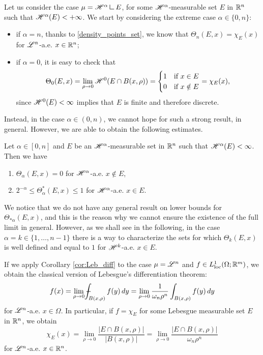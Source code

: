 Let us consider the case $\mu = \Haus{\alpha} \res E$, for some $\mathscr{H}^{\alpha}$-measurable set $E$ in $\mathbb{R}^{n}$ such that $\mathscr{H}^{\alpha}(E) < + \infty$. We start by considering the extreme case $\alpha \in \{0, n\}$:
\begin{itemize}
\item if $\alpha = n$, thanks to \eqref{density_points_set}, we know that $\Theta_{n}(E, x) = \chi_{E}(x)$ for $\mathscr{L}^{n}$-a.e. $x \in \mathbb{R}^{n}$; 
\item if $\alpha = 0$, it is easy to check that
\begin{equation*}
\Theta_{0}(E, x) = \lim_{\rho \to 0} \mathscr{H}^{0}(E \cap B(x, \rho)) = \begin{cases} 1 & \text{if} \ x \in E \\
0 & \text{if} \ x \notin E
\end{cases} = \chi_{E}(x),
\end{equation*} 
since $\mathscr{H}^{0}(E) < \infty$ implies that $E$ is finite and therefore discrete.
\end{itemize}
Instead, in the case $\alpha \in (0, n)$, we cannot hope for such a strong result, in general. However, we are able to obtain the following estimates.

\begin{proposition}
Let $\alpha \in [0, n]$ and $E$ be an $\mathscr{H}^{\alpha}$-measurable set in $\mathbb{R}^{n}$ such that $\mathscr{H}^{\alpha}(E) < \infty$. Then we have
\begin{enumerate}
\item $\Theta_{\alpha}(E, x) = 0$ for $\mathscr{H}^{\alpha}$-a.e. $x \notin E$,
\item $2^{-\alpha} \le \Theta^{*}_{\alpha}(E, x) \le 1$ for $\mathscr{H}^{\alpha}$-a.e. $x \in E$.
\end{enumerate}
\end{proposition}

We notice that we do not have any general result on lower bounds for $\Theta_{* \alpha}(E, x)$, and this is the reason why we cannot ensure the existence of the full limit in general. However, as we shall see in the following, in the case $\alpha = k \in \{1, \dots, n - 1\}$ there is a way to characterize the sets for which $\Theta_{k}(E, x)$ is well defined and equal to $1$ for $\mathscr{H}^{k}$-a.e. $x \in E$.

\begin{remark}
If we apply Corollary \ref{cor:Leb_diff} to the case $\mu = \mathscr{L}^{n}$ and $f \in L^{1}_{\rm loc}(\Omega; \mathbb{R}^{m})$, we obtain the classical version of Lebesgue's differentiation theorem:
\begin{equation*}
f(x) = \lim_{\rho \to 0} -\hspace{-1.13em}\int_{B(x, \rho)} f(y) \, dy = \lim_{\rho \to 0} \frac{1}{\omega_{n} \rho^{n}} \int_{B(x, \rho)} f(y) \, dy
\end{equation*}
for $\mathscr{L}^{n}$-a.e. $x \in \Omega$.
In particular, if $f = \chi_{E}$ for some Lebesgue measurable set $E$ in $\mathbb{R}^{n}$, we obtain
\begin{equation} \label{density_points_set}
\chi_{E}(x) = \lim_{\rho \to 0} \frac{|E \cap B(x, \rho)|}{|B(x, \rho)|} =  \lim_{\rho \to 0} \frac{|E \cap B(x, \rho)|}{\omega_{n} \rho^{n}}
\end{equation}
for $\mathscr{L}^{n}$-a.e. $x \in \mathbb{R}^{n}$.
\end{remark}

